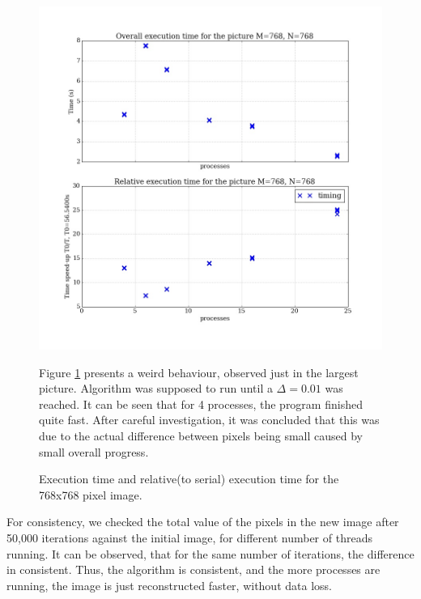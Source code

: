 \documentclass[11pt]{article}
\begin{document}
	\begin{figure}[ht]	
		\centering
		\begin{minipage}[b]{.5\textwidth}
			\centering
			\includegraphics[width=\linewidth]{exec_768x768_odd.jpeg}
			\caption{Execution time and relative(to serial) execution time for the 768x768 pixel image.}\label{exec_4odd}
		\end{minipage}%
		\begin{minipage}[b]{.5\textwidth}
			Figure \ref{exec_4odd} presents a weird behaviour, observed just in the largest picture. Algorithm was supposed to run until a $\Delta=0.01$ was reached. It can be seen that for 4 processes, the program finished quite fast. After careful investigation, it was concluded that this was due to the actual difference between pixels being small caused by small overall progress. 
		\end{minipage}
	\end{figure}
	
	For consistency, we checked the total value of the pixels in the new image after 50,000 iterations against the initial image, for different number of threads running. It can be observed, that for the same number of iterations, the difference in consistent. Thus, the algorithm is consistent, and the more processes are running, the image is just reconstructed faster, without data loss.
	
\end{document}

